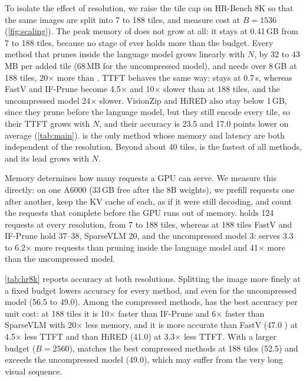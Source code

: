 

To isolate the effect of resolution, we raise the tile cap on HR-Bench 8K so that the same images are
split into 7 to 188 tiles, and measure cost at $B=1536$ (\cref{fig:scaling}). The peak memory of \method
does not grow at all: it stays at 0.41\,GB from 7 to 188 tiles, because no stage of \method ever holds
more than the budget. Every method that prunes inside the language model grows linearly with $N$, by
32 to 43\,MB per added tile (68\,MB for the uncompressed model), and needs over 8\,GB at 188 tiles,
20$\times$ more than \method. TTFT behaves the same way: \method stays at 0.7\,s, whereas FastV and
IF-Prune become 4.5$\times$ and 10$\times$ slower than \method at 188 tiles, and the uncompressed model
24$\times$ slower. VisionZip and HiRED also stay below 1\,GB, since they prune before the language model, but
they still encode every tile, so their TTFT grows with $N$, and their accuracy is 23.5 and 17.0 points lower on average
(\cref{tab:main}). \method is the only method whose memory and latency are both independent of the
resolution. Beyond about 40 tiles, \method is the fastest of all methods, and its lead grows with
$N$.

Memory determines how many requests a GPU can serve. We measure this directly: on one A6000 (33\,GB free
after the 8B weights), we prefill requests one after another, keep the KV cache of each, as if it were
still decoding, and count the requests that complete before the GPU runs out of memory. \method holds 124
requests at every resolution, from 7 to 188 tiles, whereas at 188 tiles FastV and IF-Prune hold 37--38,
SparseVLM 20, and the uncompressed model 3: \method serves 3.3 to 6.2$\times$ more requests than pruning inside
the language model and 41$\times$ more than the uncompressed model.

\cref{tab:hr8k} reports accuracy at both resolutions. Splitting the image more finely at a fixed budget
lowers accuracy for every method, and even for the uncompressed model (56.5 to 49.0). Among the
compressed methods, \method has the best accuracy per unit cost: at 188 tiles it is 10$\times$ faster
than IF-Prune and 6$\times$ faster than SparseVLM with 20$\times$ less memory, and it is more accurate
than FastV (47.0 ) at 4.5$\times$ less TTFT and than HiRED (41.0) at 3.3$\times$ less TTFT. With a larger budget
($B=2560$), \method matches the best compressed methods at 188 tiles (52.5) and exceeds the uncompressed
model (49.0), which may suffer from the very long visual sequence.

